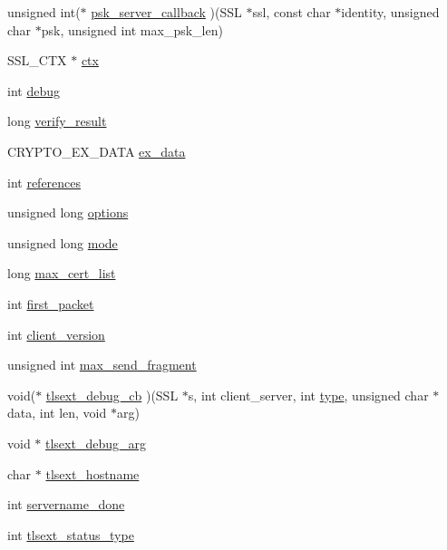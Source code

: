 \begin{DoxyCompactItemize}
unsigned int($\ast$ \hyperlink{structssl__st_afe72ae2f53bc658c0be204155759789d}{psk\-\_\-server\-\_\-callback} )(S\-S\-L $\ast$ssl, const char $\ast$identity, unsigned char $\ast$psk, unsigned int max\-\_\-psk\-\_\-len)
\item 
S\-S\-L\-\_\-\-C\-T\-X $\ast$ \hyperlink{structssl__st_a5a3ac76eff749d5d3c9ecf6b1a230497}{ctx}
\item 
int \hyperlink{structssl__st_a44db2b5a38c43821c3a852669e48d67f}{debug}
\item 
long \hyperlink{structssl__st_a3092706c43455cf6a410853d90aadb1f}{verify\-\_\-result}
\item 
C\-R\-Y\-P\-T\-O\-\_\-\-E\-X\-\_\-\-D\-A\-T\-A \hyperlink{structssl__st_ab71808924564517a2cfa30d1d5da910e}{ex\-\_\-data}
\item 
int \hyperlink{structssl__st_ac62377797495ce179f0110cb70867ccc}{references}
\item 
unsigned long \hyperlink{structssl__st_a82c8bfd123603c23ccca6fb45be6d75f}{options}
\item 
unsigned long \hyperlink{structssl__st_a10add2996a9ac029c3a8a4c19587e1b0}{mode}
\item 
long \hyperlink{structssl__st_add94a8a6fe24dad252c559253d0eea9a}{max\-\_\-cert\-\_\-list}
\item 
int \hyperlink{structssl__st_ad3c31c44e1c20703dc023f4a14fa0d54}{first\-\_\-packet}
\item 
int \hyperlink{structssl__st_af898db9604614a95a6830fbb5ce31850}{client\-\_\-version}
\item 
unsigned int \hyperlink{structssl__st_a201ff2c24c4a950fc529451563dac099}{max\-\_\-send\-\_\-fragment}
\item 
void($\ast$ \hyperlink{structssl__st_adc295a1512060b6283ef8a8b30026b16}{tlsext\-\_\-debug\-\_\-cb} )(S\-S\-L $\ast$s, int client\-\_\-server, int \hyperlink{structssl__st_a5d2a229f22c169bd5eecefd9f017e089}{type}, unsigned char $\ast$data, int len, void $\ast$arg)
\item 
void $\ast$ \hyperlink{structssl__st_a37c9fa10121176491c8a9e5617f7be83}{tlsext\-\_\-debug\-\_\-arg}
\item 
char $\ast$ \hyperlink{structssl__st_a693888a588035f237e93b0bce7af4b84}{tlsext\-\_\-hostname}
\item 
int \hyperlink{structssl__st_ac1ac6725cca99bc51b875fbe62ccb504}{servername\-\_\-done}
\item 
int \hyperlink{structssl__st_aba46c200c19caf4051d001f5ca0475e3}{tlsext\-\_\-status\-\_\-type}
\item 

\end{DoxyCompactItemize}
